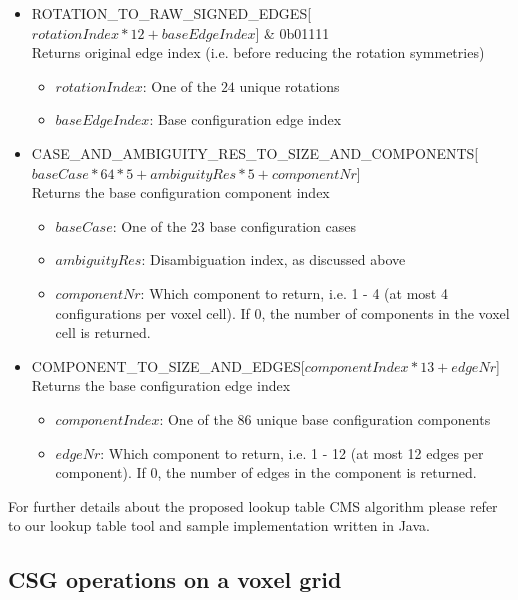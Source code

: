 \begin{itemize}
	\item ROTATION\_TO\_RAW\_SIGNED\_EDGES[$rotationIndex * 12 + baseEdgeIndex$] \& 0b01111\\
	Returns original edge index (i.e. before reducing the rotation symmetries)
	\begin{itemize}
		\item $rotationIndex$: One of the $24$ unique rotations
		\item $baseEdgeIndex$: Base configuration edge index
  \end{itemize}
	
	\item CASE\_AND\_AMBIGUITY\_RES\_TO\_SIZE\_AND\_COMPONENTS[$baseCase * 64 * 5 + ambiguityRes * 5 + componentNr$]\\
	Returns the base configuration component index
	\begin{itemize}
		\item $baseCase$: One of the $23$ base configuration cases
		\item $ambiguityRes$: Disambiguation index, as discussed above
		\item $componentNr$: Which component to return, i.e. 1 - 4 (at most 4 configurations per voxel cell). If 0, the number of components in
		the voxel cell is returned.
  \end{itemize}

	\item COMPONENT\_TO\_SIZE\_AND\_EDGES[$componentIndex * 13 + edgeNr$]\\
	Returns the base configuration edge index
	\begin{itemize}
		\item $componentIndex$: One of the $86$ unique base configuration components
		\item $edgeNr$: Which component to return, i.e. 1 - 12 (at most 12 edges per component). If 0, the number of edges in
		the component is returned.
  \end{itemize}
	
\end{itemize}

For further details about the proposed lookup table CMS algorithm please refer to our lookup table tool and sample implementation written in Java.


\subsection{CSG operations on a voxel grid}

